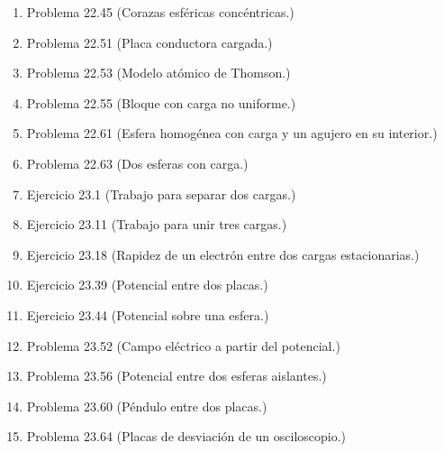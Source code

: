 \documentclass{article}
\begin{document}
\begin{enumerate}

\item
Problema 22.45 (Corazas esf\'ericas conc\'entricas.)

\item
Problema 22.51 (Placa conductora cargada.)

\item
Problema 22.53 (Modelo at\'omico de Thomson.)

\item
Problema 22.55 (Bloque con carga no uniforme.)

\item
Problema 22.61 (Esfera homog\'enea con carga y un agujero en su interior.)

\item 
Problema 22.63 (Dos esferas con carga.)

\item
Ejercicio 23.1 (Trabajo para separar dos cargas.)

\item
Ejercicio 23.11 (Trabajo para unir tres cargas.)

\item 
Ejercicio 23.18 (Rapidez de un electr\'on entre dos cargas estacionarias.)

\item 
Ejercicio 23.39 (Potencial entre dos placas.)

\item
Ejercicio 23.44 (Potencial sobre una esfera.)

\item 
Problema 23.52 (Campo el\'ectrico a partir del potencial.)

\item 
Problema 23.56 (Potencial entre dos esferas aislantes.)

\item
Problema 23.60 (P\'endulo entre dos placas.)

\item 
Problema 23.64 (Placas de desviaci\'on de un osciloscopio.)

\end{enumerate}
\end{document}
